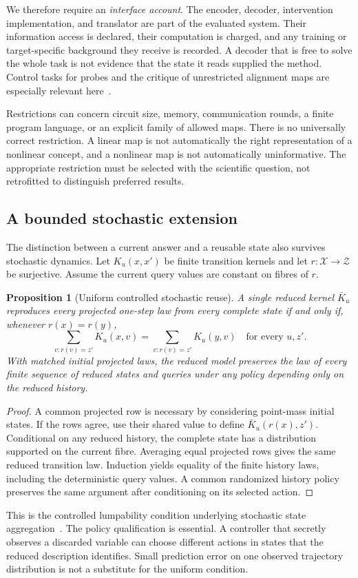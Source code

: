 \documentclass[11pt,letterpaper]{article}
\theoremstyle{plain}
\newtheorem{proposition}[theorem]{Proposition}
\theoremstyle{definition}
\newcommand{\X}{\mathcal X}\newcommand{\Z}{\mathcal Z}
\begin{document}
We therefore require an \emph{interface account}. The encoder, decoder, intervention implementation, and translator are part of the evaluated system. Their information access is declared, their computation is charged, and any training or target-specific background they receive is recorded. A decoder that is free to solve the whole task is not evidence that the state it reads supplied the method. Control tasks for probes and the critique of unrestricted alignment maps are especially relevant here~\cite{hewitt,sutter}.

Restrictions can concern circuit size, memory, communication rounds, a finite program language, or an explicit family of allowed maps. There is no universally correct restriction. A linear map is not automatically the right representation of a nonlinear concept, and a nonlinear map is not automatically uninformative. The appropriate restriction must be selected with the scientific question, not retrofitted to distinguish preferred results.

\subsection{A bounded stochastic extension}
The distinction between a current answer and a reusable state also survives stochastic dynamics. Let $K_u(x,x')$ be finite transition kernels and let $r:\X\to\Z$ be surjective. Assume the current query values are constant on fibres of $r$.

\begin{proposition}[Uniform controlled stochastic reuse]\label{prop:lumpability}
A single reduced kernel $\bar K_u$ reproduces every projected one-step law from every complete state if and only if, whenever $r(x)=r(y)$,
\[
\sum_{v:r(v)=z'}K_u(x,v)=\sum_{v:r(v)=z'}K_u(y,v)
\quad\text{for every }u,z'.
\]
With matched initial projected laws, the reduced model preserves the law of every finite sequence of reduced states and queries under any policy depending only on the reduced history.
\end{proposition}
\begin{proof}
A common projected row is necessary by considering point-mass initial states. If the rows agree, use their shared value to define $\bar K_u(r(x),z')$. Conditional on any reduced history, the complete state has a distribution supported on the current fibre. Averaging equal projected rows gives the same reduced transition law. Induction yields equality of the finite history laws, including the deterministic query values. A common randomized history policy preserves the same argument after conditioning on its selected action.
\end{proof}
This is the controlled lumpability condition underlying stochastic state aggregation~\cite{givan}. The policy qualification is essential. A controller that secretly observes a discarded variable can choose different actions in states that the reduced description identifies. Small prediction error on one observed trajectory distribution is not a substitute for the uniform condition.
\end{document}
